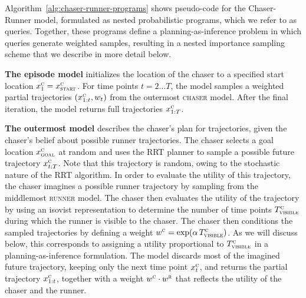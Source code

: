 \documentclass{article}
\begin{document}
Algorithm~\ref{alg:chaser-runner-programs} shows pseudo-code for the Chaser-Runner model, formulated as nested probabilistic programs, which we refer to as queries. Together, these programs define a planning-as-inference problem \cite{toussaint06} in which queries generate weighted samples, resulting in a nested importance sampling  \cite{naesseth2015nested} scheme that we describe in more detail below.

\textbf{The episode model} initializes the location of the chaser to a specified start location $x^\textsc{c}_1 = x^\textsc{c}_\textsc{start}$. For time points $t=2 \ldots T$, the model samples a weighted partial trajectories $(x^\textsc{c}_{1:t}, w_t)$ from the outermost \textsc{chaser} model. After the final iteration, the model returns full trajectories $x^\textsc{c}_{1:T}$.

\textbf{The outermost model} describes the chaser's plan for trajectories, given the chaser's belief about possible runner trajectories. The chaser selects a goal location $x^\textsc{c}_\textsc{goal}$ at random and uses the RRT planner to sample a possible future trajectory $x^\textsc{c}_{t:T}$. Note that this trajectory is random, owing to the stochastic nature of the RRT algorithm. In order to evaluate the utility of this trajectory, the chaser imagines a possible runner trajectory by sampling from the middlemost \textsc{runner} model. The chaser then evaluates the utility of the trajectory by using an isovist representation to determine the number of time points $T^\textsc{c}_\textsc{visible}$ during which the runner is visible to the chaser. The chaser then conditions the sampled trajectories by defining a weight $w^\textsc{c} = \exp( \alpha \, T^\textsc{c}_\textsc{visible})$. As we will discuss below, this corresponds to assigning a utility proportional to $T^\textsc{c}_\textsc{visible}$ in a planning-as-inference formulation. The model discards most of the imagined future trajectory, keeping only the next time point $x^\textsc{c}_t$, and returns the partial trajectory $x^\textsc{c}_{1:t}$, together with a weight $w^\textsc{c} \cdot w^\textsc{r}$ that reflects the utility of the chaser and the runner.
\end{document}
